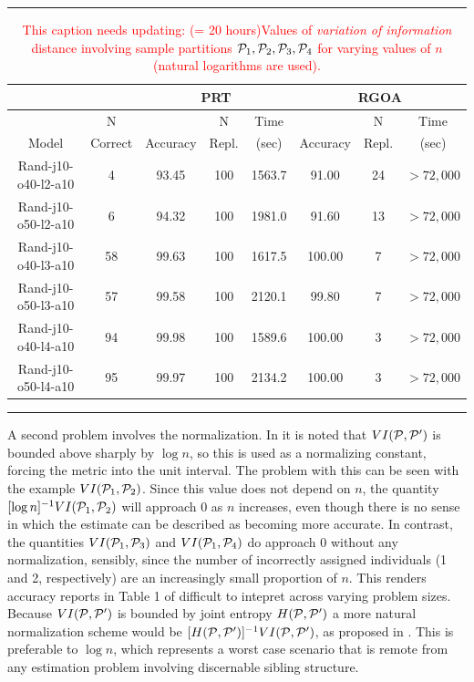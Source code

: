 \documentclass[twoside,10pt,twocolumn]{article}
\newcommand{\calp}{{\cal P}}
\begin{document}
\begin{table}
\caption{\textcolor{red}{This caption needs updating: (= 20 hours)Values of \emph{variation of information} 
distance involving sample partitions $\calp_1, \calp_2, \calp_3, \calp_4$ for varying values of $n$ (natural 
logarithms are used).}}\label{rgoa.table}
\rule{\textwidth}{0.90pt}
\begin{center}
\begin{tabular}{c|cccc|ccc}
\multicolumn{2}{c}{}&\multicolumn{3}{c}{PRT}&\multicolumn{3}{c}{RGOA} \\ \hline	
	&N 	&	&N	&Time	&&N &Time \\ 
Model	&Correct&Accuracy	&Repl.	&(sec)	&Accuracy	&Repl.&(sec) \\ \hline
Rand-j10-o40-l2-a10	&4	&93.45	&100	&1563.7	&91.00	&24	&$> 72,000$ \\
Rand-j10-o50-l2-a10	&6	&94.32	&100	&1981.0	&91.60	&13	&$> 72,000$ \\
Rand-j10-o40-l3-a10	&58	&99.63	&100	&1617.5	&100.00	&7	&$> 72,000$ \\
Rand-j10-o50-l3-a10	&57	&99.58	&100	&2120.1	&99.80	&7	&$> 72,000$ \\
Rand-j10-o40-l4-a10	&94	&99.98	&100	&1589.6	&100.00	&3	&$> 72,000$ \\
Rand-j10-o50-l4-a10	&95	&99.97	&100	&2134.2	&100.00	&3	&$> 72,000$
\end{tabular}
\end{center}
\rule{\textwidth}{0.90pt}
\end{table}


A second problem involves the normalization. In \citet{BrownDexter2012} it is noted that $VI(\calp, \calp^
\prime)$ is bounded above sharply by $\log n$, so this is used as a normalizing constant, forcing the metric 
into the unit interval. The problem with this can be seen with the example  $VI(\calp_1, \calp_2)$. Since 
this value does not depend on $n$, the quantity $[\log n]^{-1} VI(\calp_1, \calp_2)$ will approach 0 as $n$ 
increases, even though there is no sense in which the estimate can be described as becoming more accurate. 
In contrast, the quantities $VI(\calp_1, \calp_3)$ and  $VI(\calp_1, \calp_4)$ do approach 0 without any 
normalization, sensibly, since the number of incorrectly assigned individuals (1 and 2, respectively) are an 
increasingly small proportion of $n$. This renders accuracy reports in Table 1 of \citet{BrownDexter2012} 
difficult to intepret across varying problem sizes. Because $VI(\calp, \calp^\prime)$ is bounded by joint 
entropy $H(\calp, \calp^\prime)$ a more natural normalization scheme would be $[H(\calp, \calp^\prime)]^{-1} 
VI(\calp, \calp^\prime)$, as proposed in \citet{kraskovEtAl2005}. This is preferable to $\log n$, which 
represents a worst case scenario that is remote from any estimation problem involving discernable sibling 
structure. 
\end{document}
